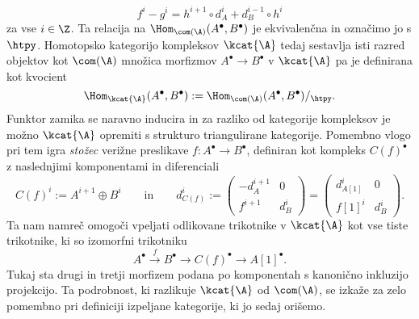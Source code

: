 \[
    f^i - g^i = h^{i+1} \circ d^i_A + d^{i-1}_B \circ h^i
\] 
za vse $i \in \Z$. Ta relacija na $\Hom_{\com(\A)}(A^\bullet, B^\bullet)$ je ekvivalenčna in označimo jo s $\htpy$. Homotopsko kategorijo kompleksov $\kcat{\A}$ tedaj sestavlja isti razred objektov kot $\com(\A)$ množica morfizmov $A^\bullet \to B^\bullet$ v $\kcat{\A}$ pa je definirana kot kvocient
\[
    \Hom_{\kcat{\A}}(A^\bullet, B^\bullet) := \Hom_{\com(\A)}(A^\bullet, B^\bullet)/_\htpy.
\]
Funktor zamika se naravno inducira in za razliko od kategorije kompleksov je možno $\kcat{\A}$ opremiti s strukturo triangulirane kategorije. Pomembno vlogo pri tem igra \emph{stožec} verižne preslikave $f \colon A^\bullet \to B^\bullet$, definiran kot kompleks $C(f)^\bullet$ z naslednjimi komponentami in diferenciali
\[
    C(f)^i := A^{i+1} \oplus B^i \qquad \text{in} \qquad d^i_{C(f)} := \begin{pmatrix}
            -d^{i+1}_A & 0 \\ f^{i+1} & d^i_B
        \end{pmatrix} = \begin{pmatrix}
            d^i_{A[1]} & 0 \\ f[1]^i & d^i_B
        \end{pmatrix}.
\]
Ta nam namreč omogoči vpeljati odlikovane trikotnike v $\kcat{\A}$ kot vse tiste trikotnike, ki so izomorfni trikotniku
\[
    A^\bullet \xrightarrow{ \ f \ } B^\bullet \longrightarrow C(f)^\bullet \longrightarrow A[1]^\bullet.
\]
Tukaj sta drugi in tretji morfizem podana po komponentah s kanonično inkluzijo \oz projekcijo. 
Ta podrobnost, ki razlikuje $\kcat{\A}$ od $\com(\A)$, se izkaže za zelo pomembno pri definiciji izpeljane kategorije, ki jo sedaj orišemo.  

